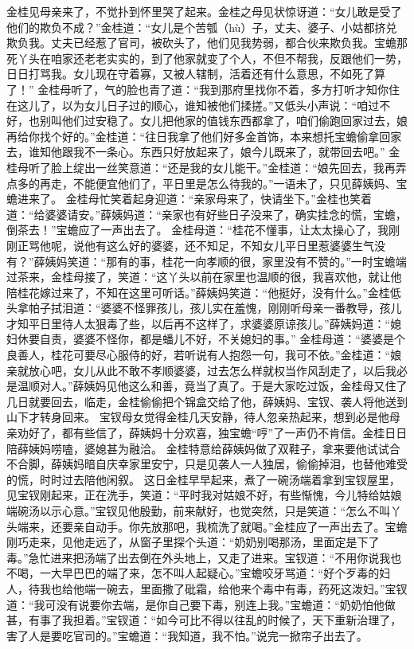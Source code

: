 \documentclass[12pt,oneside]{book}
\begin{document}
金桂见母亲来了，不觉扑到怀里哭了起来。金桂之母见状惊讶道：“女儿敢是受了他们的欺负不成？”金桂道：“女儿是个苦瓠（hù）子，丈夫、婆子、小姑都挤兑欺负我。丈夫已经惹了官司，被砍头了，他们见我势弱，都合伙来欺负我。宝蟾那死丫头在咱家还老老实实的，到了他家就变了个人，不但不帮我，反跟他们一势，日日打骂我。女儿现在守着寡，又被人辖制，活着还有什么意思，不如死了算了！”
金桂母听了，气的脸也青了道：“我到那府里找你不着，多方打听才知你住在这儿了，以为女儿日子过的顺心，谁知被他们揉搓。”又低头小声说：“咱过不好，也别叫他们过安稳了。女儿把他家的值钱东西都拿了，咱们偷跑回家过去，娘再给你找个好的。”金桂道：“往日我拿了他们好多金首饰，本来想托宝蟾偷拿回家去，谁知他跟我不一条心。东西只好放起来了，娘今儿既来了，就带回去吧。”
金桂母听了脸上绽出一丝笑意道：“还是我的女儿能干。”金桂道：“娘先回去，我再弄点多的再走，不能便宜他们了，平日里是怎么待我的。”一语未了，只见薛姨妈、宝蟾进来了。
金桂母忙笑着起身迎道：“亲家母来了，快请坐下。”金桂也笑着道：“给婆婆请安。”薛姨妈道：“亲家也有好些日子没来了，确实挂念的慌，宝蟾，倒茶去！”宝蟾应了一声出去了。
金桂母道：“桂花不懂事，让太太操心了，我刚刚正骂他呢，说他有这么好的婆婆，还不知足，不知女儿平日里惹婆婆生气没有？”薛姨妈笑道：“那有的事，桂花一向孝顺的很，家里没有不赞的。”一时宝蟾端过茶来，金桂母接了，笑道：“这丫头以前在家里也温顺的很，我喜欢他，就让他陪桂花嫁过来了，不知在这里可听话。”薛姨妈笑道：“他挺好，没有什么。”金桂低头拿帕子拭泪道：“婆婆不怪罪孩儿，孩儿实在羞愧，刚刚听母亲一番教导，孩儿才知平日里待人太狠毒了些，以后再不这样了，求婆婆原谅孩儿。”薛姨妈道：“媳妇休要自责，婆婆不怪你，都是蟠儿不好，不关媳妇的事。”
金桂母道：“婆婆是个良善人，桂花可要尽心服侍的好，若听说有人抱怨一句，我可不依。”金桂道：“娘亲就放心吧，女儿从此不敢不孝顺婆婆，过去怎么样就权当作风刮走了，以后我必是温顺对人。”薛姨妈见他这么和善，竟当了真了。于是大家吃过饭，金桂母又住了几日就要回去，临走，金桂偷偷把个锦盒交给了他，薛姨妈、宝钗、袭人将他送到山下才转身回来。
宝钗母女觉得金桂几天安静，待人忽亲热起来，想到必是他母亲劝好了，都有些信了，薛姨妈十分欢喜，独宝蟾“哼”了一声仍不肯信。金桂日日陪薛姨妈唠嗑，婆媳甚为融洽。
金桂特意给薛姨妈做了双鞋子，拿来要他试试合不合脚，薛姨妈暗自庆幸家里安宁，只是见袭人一人独居，偷偷掉泪，也替他难受的慌，时时过去陪他闲叙。
这日金桂早早起来，煮了一碗汤端着拿到宝钗屋里，见宝钗刚起来，正在洗手，笑道：“平时我对姑娘不好，有些惭愧，今儿特给姑娘端碗汤以示心意。”宝钗见他殷勤，前来献好，也觉突然，只是笑道：“怎么不叫丫头端来，还要亲自动手。你先放那吧，我梳洗了就喝。”金桂应了一声出去了。宝蟾刚巧走来，见他走远了，从窗子里探个头道：“奶奶别喝那汤，里面定是下了毒。”急忙进来把汤端了出去倒在外头地上，又走了进来。宝钗道：“不用你说我也不喝，一大早巴巴的端了来，怎不叫人起疑心。”宝蟾咬牙骂道：“好个歹毒的妇人，待我也给他端一碗去，里面撒了砒霜，给他来个毒中有毒，药死这泼妇。”宝钗道：“我可没有说要你去端，是你自己要下毒，别连上我。”宝蟾道：“奶奶怕他做甚，有事了我担着。”宝钗道：“如今可比不得以往乱的时候了，天下重新治理了，害了人是要吃官司的。”宝蟾道：“我知道，我不怕。”说完一掀帘子出去了。
\end{document}
